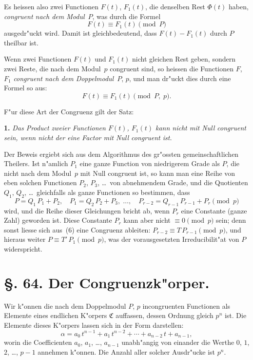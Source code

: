 \documentclass[12pt,a4paper]{article}
\theoremstyle{plain}
\theoremstyle{definition}
\theoremstyle{remark}
\begin{document}
Es heissen also zwei Functionen $F(t)$, $F_{1}(t)$, die denselben Rest $\Phi(t)$ haben, \emph{congruent nach dem Modul}~$P$, was durch die Formel
\[
F(t) \equiv F_{1}(t) \pmod{P}
\]
ausgedr"uckt wird. Damit ist gleichbedeutend, dass $F(t) - F_{1}(t)$ durch $P$ theilbar ist.

Wenn zwei Functionen $F(t)$ und $F_{1}(t)$ nicht gleichen Rest geben, sondern zwei Reste, die nach dem Modul~$p$ congruent sind, so heissen die Functionen $F$, $F_{1}$ \emph{congruent nach dem Doppelmodul}~$P$, $p$, und man dr"uckt dies durch eine Formel so aus:
\begin{equation}\tag{5}
F(t) \equiv F_{1}(t) \pmod{P,\; p}.
\end{equation}

F"ur diese Art der Congruenz gilt der Satz:

\medskip\noindent\textbf{1.} \emph{Das Product zweier Functionen $F(t)$, $F_{1}(t)$ kann nicht mit Null congruent sein, wenn nicht der eine Factor mit Null congruent ist.}

\smallskip
Der Beweis ergiebt sich aus dem Algorithmus des gr"ossten gemeinschaftlichen Theilers. Ist n"amlich $P_{1}$ eine ganze Function von niedrigerem Grade als $P$, die nicht nach dem Modul~$p$ mit Null congruent ist, so kann man eine Reihe von eben solchen Functionen $P_{2}$, $P_{3}$, \ldots\ von abnehmendem Grade, und die Quotienten $Q_{1}$, $Q_{2}$, \ldots\ gleichfalls als ganze Functionen so bestimmen, dass
\begin{equation}\tag{6}
P = Q_{1}\,P_{1} + P_{2},\quad P_{1} = Q_{2}\,P_{2} + P_{3},\; \ldots,\quad
P_{r-2} = Q_{r-1}\,P_{r-1} + P_{r} \pmod{p}
\end{equation}
wird, und die Reihe dieser Gleichungen bricht ab, wenn $P_{r}$ eine Constante (ganze Zahl) geworden ist. Diese Constante $P_{r}$ kann aber nicht $\equiv 0 \pmod{p}$ sein; denn sonst liesse sich aus~(6) eine Congruenz ableiten: $P_{r-2} \equiv T\,P_{r-1} \pmod{p}$, und hieraus weiter $P \equiv T'\,P_{1} \pmod{p}$, was der vorausgesetzten Irreducibilit"at von $P$ widerspricht.

\section*{\S. 64. Der Congruenzk"orper.}

Wir k"onnen die nach dem Doppelmodul $P$, $p$ incongruenten Functionen als Elemente eines endlichen K"orpers $\mathfrak{C}$ auffassen, dessen Ordnung gleich $p^{n}$ ist. Die Elemente dieses K"orpers lassen sich in der Form darstellen:
\begin{equation}\tag{1}
\alpha = a_{0}\,t^{n-1} + a_{1}\,t^{n-2} + \cdots + a_{n-2}\,t + a_{n-1},
\end{equation}
worin die Coefficienten $a_{0}$, $a_{1}$, \ldots, $a_{n-1}$ unabh"angig von einander die Werthe $0$, $1$, $2$, \ldots, $p-1$ annehmen k"onnen. Die Anzahl aller solcher Ausdr"ucke ist $p^{n}$.
\end{document}
